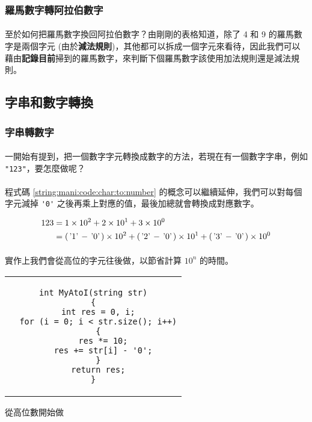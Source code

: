 \documentclass[12pt,a4paper,oneside]{report}
\begin{document}
\begin{CJK}{UTF8}{bkai}
\subsubsection{羅馬數字轉阿拉伯數字}

\paragraph{}至於如何把羅馬數字換回阿拉伯數字？由剛剛的表格知道，除了 4 和 9 的羅馬數字是兩個字元 (由於\textbf{減法規則})，其他都可以拆成一個字元來看待，因此我們可以藉由{\color{red}\textbf{記錄目前}}掃到的羅馬數字，來判斷下個羅馬數字該使用加法規則還是減法規則。

\subsection{字串和數字轉換}

\subsubsection{字串轉數字}

\paragraph{}一開始有提到，把一個數字字元轉換成數字的方法，若現在有一個數字字串，例如 \lstinline!"123"!，要怎麼做呢？

\paragraph{}程式碼 \ref{string:mani:code:char:to:number} 的概念可以繼續延伸，我們可以對每個字元減掉 \lstinline!'0'! 之後再乘上對應的值，最後加總就會轉換成對應數字。

\begin{align*}
123&=1\times{{10}^2}+2\times{{10}^1}+3\times{{10}^0}\\
&=(\text{\lstinline!'1'!}-\text{\lstinline!'0'!})\times{{10}^2}+(\text{\lstinline!'2'!}-\text{\lstinline!'0'!})\times{{10}^1}+(\text{\lstinline!'3'!}-\text{\lstinline!'0'!})\times{{10}^0}
\end{align*}

\paragraph{}實作上我們會從高位的字元往後做，以節省計算 ${10}^n$ 的時間。

\begin{code}[h!]
  \centering
  \begin{tabular}{c}
  \begin{lstlisting}
int MyAtoI(string str)
{
  int res = 0, i;
  for (i = 0; i < str.size(); i++)
  {
    res *= 10;
    res += str[i] - '0';
  }
  return res;
}
  \end{lstlisting}
  \end{tabular}
  \caption{從高位數開始做}
  \label{string:mani:code:my:atoi}
\end{code}


\end{CJK}
\end{document}
